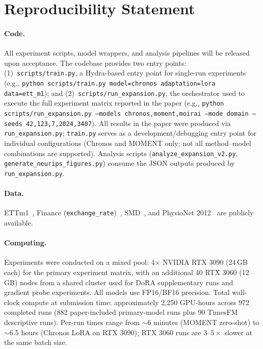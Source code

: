 \section{Reproducibility Statement}
\label{sec:repro}

\paragraph{Code.} All experiment scripts, model wrappers, and analysis pipelines will be released upon acceptance. The codebase provides two entry points: (1)~\texttt{scripts/train.py}, a Hydra-based entry point for single-run experiments (e.g., \texttt{python scripts/train.py model=chronos adaptation=lora data=ett\_m1}); and (2)~\texttt{scripts/run\_expansion.py}, the orchestrator used to execute the full experiment matrix reported in the paper (e.g., \texttt{python scripts/run\_expansion.py --models chronos,moment,moirai --mode domain --seeds 42,123,7,2024,3407}). All results in the paper were produced via \texttt{run\_expansion.py}; \texttt{train.py} serves as a development/debugging entry point for individual configurations (Chronos and MOMENT only; not all method--model combinations are supported). Analysis scripts (\texttt{analyze\_expansion\_v2.py}, \texttt{generate\_neurips\_figures.py}) consume the JSON outputs produced by \texttt{run\_expansion.py}.

\paragraph{Data.} ETTm1~\citep{zhou2021ett}, Finance (\texttt{exchange\_rate})~\citep{li2019logsparse}, SMD~\citep{su2019robust}, and PhysioNet 2012~\citep{silva2012physionet} are publicly available.

\paragraph{Computing.} Experiments were conducted on a mixed pool: 4$\times$ NVIDIA RTX 3090 (24\,GB each) for the primary experiment matrix, with an additional 40 RTX 3060 (12\,GB) nodes from a shared cluster used for DoRA supplementary runs and gradient probe experiments. All models use FP16/BF16 precision. Total wall-clock compute at submission time: approximately 2,250 GPU-hours across 972 completed runs (882 paper-included primary-model runs plus 90 TimesFM descriptive runs). Per-run times range from ${\sim}$6 minutes (MOMENT zero-shot) to ${\sim}$6.5 hours (Chronos LoRA on RTX 3090); RTX 3060 runs are $3$--$5\times$ slower at the same batch size.

